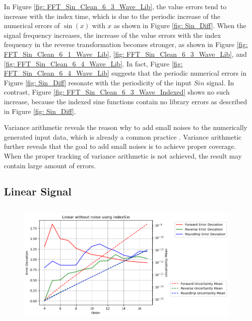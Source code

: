 \documentclass[twoside]{article}
\numberwithin{equation}{section}
\begin{document}
In Figure \ref{fig: FFT_Sin_Clean_6_3_Wave_Lib}, the value errors tend to increase with the index time, which is due to the periodic increase of the numerical errors of $\sin(x)$ with $x$ as shown in Figure \ref{fig: Sin_Diff}.
When the signal frequency increases, the increase of the value errors with the index frequency in the reverse transformation becomes stronger, as shown in Figure \ref{fig: FFT_Sin_Clean_6_1_Wave_Lib}, \ref{fig: FFT_Sin_Clean_6_3_Wave_Lib}, and \ref{fig: FFT_Sin_Clean_6_4_Wave_Lib}.
In fact, Figure \ref{fig: FFT_Sin_Clean_6_4_Wave_Lib} suggests that the periodic numerical errors in  Figure \ref{fig: Sin_Diff} resonate with the periodicity of the input $Sin$ signal.
In contrast, Figure \ref{fig: FFT_Sin_Clean_6_3_Wave_Indexed} shows no such increase, because the indexed sine functions contain no library errors as described in Figure \ref{fig: Sin_Diff}.

Variance arithmetic reveals the reason why to add small noises to the numerically generated input data, which is already a common practice \cite{Numerical_Recipes}.
Variance arithmetic further reveals that the goal to add small noises is to achieve proper coverage.
When the proper tracking of variance arithmetic is not achieved, the result may contain large amount of errors.


\subsection{Linear Signal}

\begin{figure}[p]
\centering
\includegraphics[height=2.5in]{FFT_Linear_Clean_vs_Order_Indexed.png} 
\label{fig: FFT_Linear_vs_Order_Indexed}
\end{figure}
\end{document}

